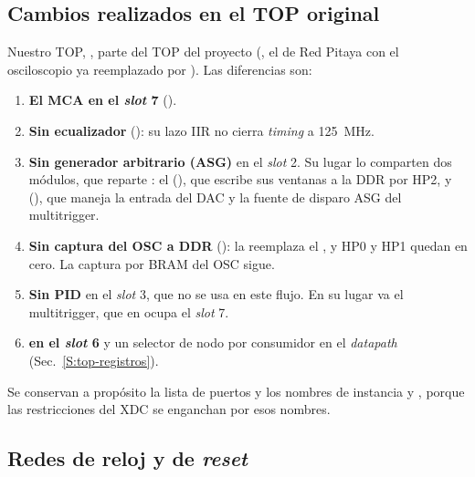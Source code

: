\subsection{Cambios realizados en el TOP original}
\label{S:top-cambios}

\begin{sloppypar}
Nuestro TOP, , parte del TOP del proyecto
(, el de Red Pitaya con el osciloscopio ya
reemplazado por ). Las diferencias son:
\end{sloppypar}
\begin{enumerate}
  \item \textbf{El MCA en el \emph{slot} 7} ().
  \item \textbf{Sin ecualizador} (): su lazo IIR no cierra
    \emph{timing} a \qty{125}{\mega\hertz}.
  \item \textbf{Sin generador arbitrario (ASG)} en el \emph{slot} 2. Su lugar lo
    comparten dos módulos, que reparte : el
     (), que escribe sus ventanas a la
    DDR por HP2, y  (), que maneja la
    entrada del DAC y la fuente de disparo ASG del multitrigger.
  \item \textbf{Sin captura del OSC a DDR} (): la reemplaza
    el , y HP0 y HP1 quedan en cero. La captura por BRAM del
    OSC sigue.
  \item \textbf{Sin PID} en el \emph{slot} 3, que no se usa en este flujo. En su lugar
    va el multitrigger, que en  ocupa el \emph{slot} 7.
  \item \textbf{ en el \emph{slot} 6} y un selector de nodo por
    consumidor en el \emph{datapath} (Sec.~\ref{S:top-registros}).
\end{enumerate}

Se conservan a propósito la lista de puertos y los nombres de instancia
 y , porque las restricciones del
XDC se enganchan por esos nombres.

\subsection{Redes de reloj y de \emph{reset}}
\label{S:top-relojes}

